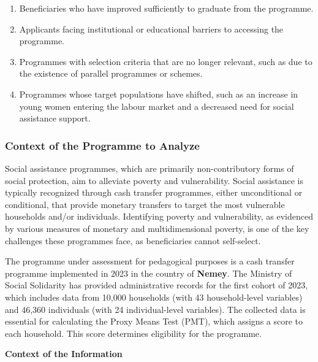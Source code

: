 \documentclass[
]{article}
\begin{document}
\begin{itemize}
  \begin{enumerate}
  \def\labelenumi{\alph{enumi}.}
  \item
    Beneficiaries who have improved sufficiently to graduate from the
    programme.\\
  \item
    Applicants facing institutional or educational barriers to accessing
    the programme.\\
  \item
    Programmes with selection criteria that are no longer relevant, such
    as due to the existence of parallel programmes or schemes.\\
  \item
    Programmes whose target populations have shifted, such as an
    increase in young women entering the labour market and a decreased
    need for social assistance support.
  \end{enumerate}
\end{itemize}

\subsubsection{\texorpdfstring{\textbf{Context of the Programme to
Analyze}}{Context of the Programme to Analyze}}\label{context-of-the-programme-to-analyze}

Social assistance programmes, which are primarily non-contributory forms
of social protection, aim to alleviate poverty and vulnerability. Social
assistance is typically recognized through cash transfer programmes,
either unconditional or conditional, that provide monetary transfers to
target the most vulnerable households and/or individuals. Identifying
poverty and vulnerability, as evidenced by various measures of monetary
and multidimensional poverty, is one of the key challenges these
programmes face, as beneficiaries cannot self-select.

The programme under assessment for pedagogical purposes is a cash
transfer programme implemented in 2023 in the country of \textbf{Nemey}.
The Ministry of Social Solidarity has provided administrative records
for the first cohort of 2023, which includes data from 10,000 households
(with 43 household-level variables) and 46,360 individuals (with 24
individual-level variables). The collected data is essential for
calculating the Proxy Means Test (PMT), which assigns a score to each
household. This score determines eligibility for the programme.

\textbf{Context of the Information}
\end{document}
